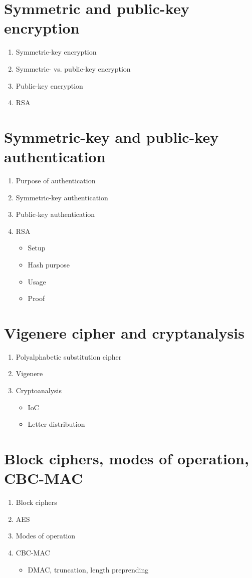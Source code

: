 \documentclass{article}
\begin{document}
\section{Symmetric and public-key encryption}
\begin{enumerate}
\item Symmetric-key encryption
\item Symmetric- vs. public-key encryption
\item Public-key encryption
\item RSA
\end{enumerate}
\clearpage

\section{Symmetric-key and public-key authentication}
\begin{enumerate}
\item Purpose of authentication
\item Symmetric-key authentication
\item Public-key authentication
\item RSA
  \begin{itemize}
  \item Setup
  \item Hash purpose
  \item Usage
  \item Proof
  \end{itemize}
\end{enumerate}
\clearpage

\section{Vigenere cipher and cryptanalysis}
\begin{enumerate}
\item Polyalphabetic substitution cipher
\item Vigenere
\item Cryptoanalysis
  \begin{itemize}
  \item IoC
  \item Letter distribution
  \end{itemize}
\end{enumerate}
\clearpage

\section{Block ciphers, modes of operation, CBC-MAC}
\begin{enumerate}
\item Block ciphers
\item AES
\item Modes of operation
\item CBC-MAC
  \begin{itemize}
  \item DMAC, truncation, length preprending
  \end{itemize}
\end{enumerate}
\clearpage
\end{document}
